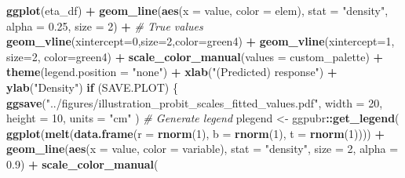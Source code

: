 \documentclass[
]{article}
\newenvironment{Shaded}{\begin{snugshade}}{\end{snugshade}}
\newcommand{\AttributeTok}[1]{\textcolor[rgb]{0.13,0.29,0.53}{#1}}
\newcommand{\CommentTok}[1]{\textcolor[rgb]{0.56,0.35,0.01}{\textit{#1}}}
\newcommand{\ControlFlowTok}[1]{\textcolor[rgb]{0.13,0.29,0.53}{\textbf{#1}}}
\newcommand{\DecValTok}[1]{\textcolor[rgb]{0.00,0.00,0.81}{#1}}
\newcommand{\FloatTok}[1]{\textcolor[rgb]{0.00,0.00,0.81}{#1}}
\newcommand{\FunctionTok}[1]{\textcolor[rgb]{0.13,0.29,0.53}{\textbf{#1}}}
\newcommand{\NormalTok}[1]{#1}
\newcommand{\OtherTok}[1]{\textcolor[rgb]{0.56,0.35,0.01}{#1}}
\newcommand{\SpecialCharTok}[1]{\textcolor[rgb]{0.81,0.36,0.00}{\textbf{#1}}}
\newcommand{\StringTok}[1]{\textcolor[rgb]{0.31,0.60,0.02}{#1}}
\begin{document}
\begin{Shaded}
\begin{Highlighting}[]
\FunctionTok{ggplot}\NormalTok{(eta\_df) }\SpecialCharTok{+}
  \FunctionTok{geom\_line}\NormalTok{(}\FunctionTok{aes}\NormalTok{(}\AttributeTok{x =}\NormalTok{ value, }\AttributeTok{color =}\NormalTok{ elem), }\AttributeTok{stat =} \StringTok{"density"}\NormalTok{,}
            \AttributeTok{alpha =} \FloatTok{0.25}\NormalTok{, }\AttributeTok{size =} \DecValTok{2}\NormalTok{) }\SpecialCharTok{+}
  \CommentTok{\# True values}
  \FunctionTok{geom\_vline}\NormalTok{(}\AttributeTok{xintercept=}\DecValTok{0}\NormalTok{,}\AttributeTok{size=}\DecValTok{2}\NormalTok{,}\AttributeTok{color=}\StringTok{\textquotesingle{}green4\textquotesingle{}}\NormalTok{) }\SpecialCharTok{+}
  \FunctionTok{geom\_vline}\NormalTok{(}\AttributeTok{xintercept=}\DecValTok{1}\NormalTok{, }\AttributeTok{size=}\DecValTok{2}\NormalTok{, }\AttributeTok{color=}\StringTok{\textquotesingle{}green4\textquotesingle{}}\NormalTok{) }\SpecialCharTok{+}
  \FunctionTok{scale\_color\_manual}\NormalTok{(}\AttributeTok{values =}\NormalTok{ custom\_palette) }\SpecialCharTok{+}
  \FunctionTok{theme}\NormalTok{(}\AttributeTok{legend.position =} \StringTok{"none"}\NormalTok{) }\SpecialCharTok{+}
  \FunctionTok{xlab}\NormalTok{(}\StringTok{"(Predicted) response"}\NormalTok{) }\SpecialCharTok{+}
  \FunctionTok{ylab}\NormalTok{(}\StringTok{"Density"}\NormalTok{)}
\ControlFlowTok{if}\NormalTok{ (SAVE.PLOT) \{}
  \FunctionTok{ggsave}\NormalTok{(}\StringTok{"../figures/illustration\_probit\_scales\_fitted\_values.pdf"}\NormalTok{,}
    \AttributeTok{width =} \DecValTok{20}\NormalTok{, }\AttributeTok{height =} \DecValTok{10}\NormalTok{, }\AttributeTok{units =} \StringTok{"cm"}
\NormalTok{  )}
  \CommentTok{\# Generate legend}
\NormalTok{  plegend }\OtherTok{\textless{}{-}}\NormalTok{ ggpubr}\SpecialCharTok{::}\FunctionTok{get\_legend}\NormalTok{(}
    \FunctionTok{ggplot}\NormalTok{(}\FunctionTok{melt}\NormalTok{(}\FunctionTok{data.frame}\NormalTok{(}\AttributeTok{r =} \FunctionTok{rnorm}\NormalTok{(}\DecValTok{1}\NormalTok{), }\AttributeTok{b =} \FunctionTok{rnorm}\NormalTok{(}\DecValTok{1}\NormalTok{),}
                           \AttributeTok{t =} \FunctionTok{rnorm}\NormalTok{(}\DecValTok{1}\NormalTok{)))) }\SpecialCharTok{+}
      \FunctionTok{geom\_line}\NormalTok{(}\FunctionTok{aes}\NormalTok{(}\AttributeTok{x =}\NormalTok{ value, }\AttributeTok{color =}\NormalTok{ variable), }\AttributeTok{stat =} \StringTok{"density"}\NormalTok{,}
                \AttributeTok{size =} \DecValTok{2}\NormalTok{, }\AttributeTok{alpha =} \FloatTok{0.9}\NormalTok{) }\SpecialCharTok{+}
      \FunctionTok{scale\_color\_manual}\NormalTok{(}

\end{Highlighting}
\end{Shaded}
\end{document}
